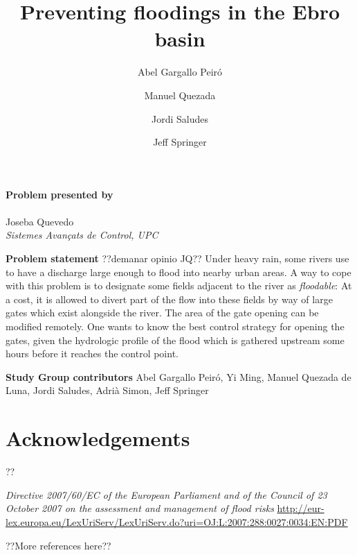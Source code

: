 \documentclass[a4paper,12pt,english]{article}
\title{Preventing floodings in the Ebro basin}
\author{Abel Gargallo Peir\'o\and
Manuel Quezada\and
Jordi Saludes\and
Jeff Springer}
\begin{document}
\maketitle

\begin{center}
\textbf{Problem presented by} \\ \ \\ \large Joseba Quevedo \\ \normalsize \textit{Sistemes Avan{\c c}ats de Control, UPC}
\end{center}

\begin{center}
\textbf{Problem statement}
??demanar opinio JQ??
Under heavy rain, some rivers use to have a discharge large enough to flood into
nearby urban areas.
A way to cope with this problem is to designate some fields adjacent to the river as \emph{floodable}:
At a cost, it is allowed to divert part of the flow into these fields by way of large gates
which exist alongside the river. The area of the gate opening can be modified remotely.
One wants to know the best control strategy for opening the gates, given the hydrologic profile
of the flood which is gathered upstream some hours before it reaches the control point.
\end{center}



\begin{center}
\textbf{Study Group contributors}
Abel Gargallo Peir\'o,
Yi Ming,
Manuel Quezada de Luna,
Jordi Saludes,
Adri\`a Simon,
Jeff Springer
\end{center}

\newpage


\section*{Acknowledgements}
??

\begin{thebibliography}{99}
\emph{Directive 2007/60/EC of the European Parliament and of the Council of 23 October 2007 on the assessment and management of flood risks}
\url{http://eur-lex.europa.eu/LexUriServ/LexUriServ.do?uri=OJ:L:2007:288:0027:0034:EN:PDF}

??More references here??
\end{thebibliography}
\end{document}
